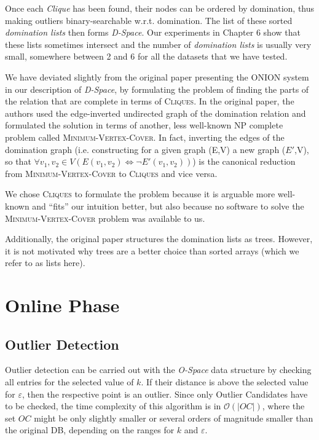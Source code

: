 \documentclass[runningheads]{llncs}
\begin{document}
Once each \emph{Clique} has been found, their nodes can be ordered by domination, thus making outliers binary-searchable w.r.t. domination. The list of these sorted \emph{domination lists} then forms \emph{D-Space}. Our experiments in Chapter 6 show that these lists sometimes intersect and the number of \emph{domination lists} is usually very small, somewhere between 2 and 6 for all the datasets that we have tested.

We have deviated slightly from the original paper presenting the ONION system \cite{onion} in our description of \emph{D-Space}, by formulating the problem of finding the parts of the relation that are complete in terms of \textsc{Cliques}. In the original paper, the authors used the edge-inverted undirected graph of the domination relation and formulated the solution in terms of another, less well-known NP complete problem called \textsc{Minimum-Vertex-Cover}. In fact, inverting the edges of the domination graph (i.e. constructing for a given graph (E,V) a new graph ($E'$,V), so that $\forall v_1,v_2\in V(E(v_1,v_2) \iff \neg E'(v_1,v_2))$) is the canonical \cite{cormen} reduction from \textsc{Minimum-Vertex-Cover} to \textsc{Cliques} and vice versa.

We chose \textsc{Cliques} to formulate the problem because it is arguable more well-known  and ``fits'' our intuition better, but also because no software to solve the \textsc{Minimum-Vertex-Cover} problem was available to us.

Additionally, the original paper structures the domination lists as trees. However, it is not motivated why trees are a better choice than sorted arrays (which we refer to as lists here).

\section{Online Phase}
\subsection{Outlier Detection}

Outlier detection can be carried out with the \emph{O-Space} data structure by checking all entries for the selected value of $k$. If their distance is above the selected value for $\varepsilon$, then the respective point is an outlier. Since only Outlier Candidates have to be checked, the time complexity of this algorithm is in $\mathcal{O}(|OC|)$, where the set $OC$ might be only slightly smaller or several orders of magnitude smaller than the original DB, depending on the ranges for $k$ and $\varepsilon$.
\end{document}
